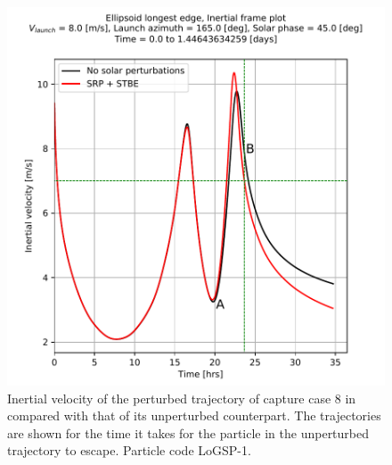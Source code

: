 \begin{figure}[htb]
\centering
\captionsetup{justification=centering}
\includegraphics[width=\textwidth, height=0.5\textheight, keepaspectratio=true]{longest_edge_perturbations/3.2Density_1cmSize/8ms_165Azimuth_45SolarPhase/comparative_analysis_allPerturbations_inertialVelocity_edit.pdf}
\caption{Inertial velocity of the perturbed trajectory of capture case 8 in  compared with that of its unperturbed counterpart. The trajectories are shown for the time it takes for the particle in the unperturbed trajectory to escape. Particle code LoGSP-1.}
\label{fig:LoGSP_1_capture_case_8_comparative_inertial_velocity}
\end{figure}
\FloatBarrier
